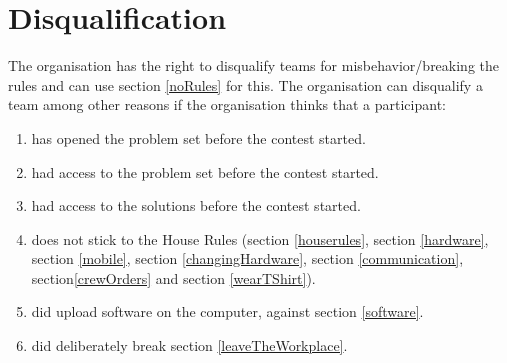 \documentclass[11pt]{report}
\begin{document}
\section{Disqualification}
The organisation has the right to disqualify teams for misbehavior/breaking the rules and can use section \ref{noRules} for this. The organisation can disqualify a team among other reasons if the organisation thinks that a participant:
\begin{enumerate}[label=\bfseries 4.7.\arabic*]
\item \label{Problemset} has opened the problem set before the contest started.
\item \label{proofProblemset} had access to the problem set before the contest started.
\item \label{proofSolutions} had access to the solutions before the contest started.
\item does not stick to the House Rules (section \ref{houserules}, section \ref{hardware}, section \ref{mobile}, section \ref{changingHardware}, section \ref{communication}, section\ref{crewOrders} and section \ref{wearTShirt}).
\item did upload software on the computer, against section \ref{software}.
\item did deliberately break section \ref{leaveTheWorkplace}.
\end{enumerate}
\end{document}
